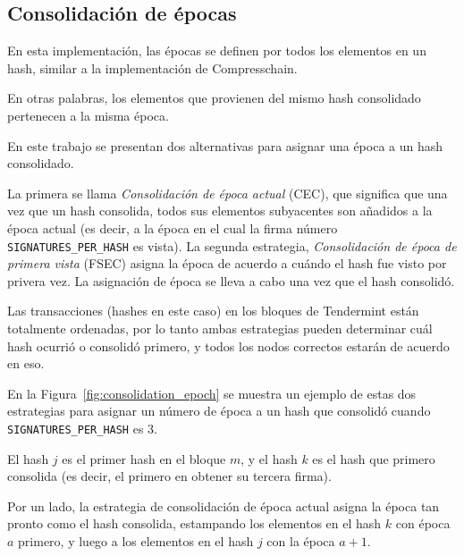 \subsection{Consolidación de épocas}\label{subsubsec:consolidation}

En esta implementación, las épocas se definen por todos los elementos en un hash, similar
a la implementación de Compresschain.

%
En otras palabras, los elementos que provienen del mismo hash consolidado pertenecen a la
misma época.

%
%

%

En este trabajo se presentan dos alternativas para asignar una época a un hash consolidado.

%
La primera se llama \textit{Consolidación de época actual} (CEC), que significa que 
una vez que un hash consolida, todos sus elementos subyacentes son añadidos a la época actual
(es decir, a la época en el cual la firma número \texttt{SIGNATURES\_PER\_HASH} es vista).
%
La segunda estrategia, \textit{Consolidación de época de primera vista} (FSEC) asigna la época
de acuerdo a cuándo el hash fue visto por privera vez. La asignación de época se lleva
a cabo una vez que el hash consolidó. 

%
Las transacciones (hashes en este caso) en los bloques de Tendermint están totalmente ordenadas,
por lo tanto ambas estrategias pueden determinar cuál hash ocurrió o consolidó primero, y
todos los nodos correctos estarán de acuerdo en eso.

%

En la Figura~\ref{fig:consolidation_epoch} se muestra un ejemplo de estas dos estrategias para asignar
un número de época a un hash que consolidó cuando \texttt{SIGNATURES\_PER\_HASH} es 3.

%
El hash $j$ es el primer hash en el bloque $m$, y el hash $k$ es el hash que primero consolida
(es decir, el primero en obtener su tercera firma).

%
Por un lado, la estrategia de consolidación de época actual asigna la época tan pronto como
el hash consolida, estampando los elementos en el hash $k$ con época $a$ primero, y luego
a los elementos en el hash $j$ con la época $a+1$.

